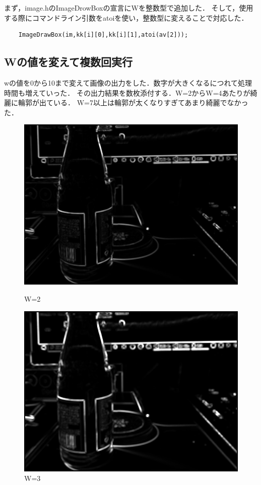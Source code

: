 \documentclass[11pt]{jarticle}
\begin{document}
まず，image.hのImageDrowBoxの宣言にWを整数型で追加した．
そして，使用する際にコマンドライン引数をatoiを使い，整数型に変えることで対応した．
\begin{verbatim}
    ImageDrawBox(im,kk[i][0],kk[i][1],atoi(av[2]));
\end{verbatim}

\subsection{Wの値を変えて複数回実行}
wの値を0から10まで変えて画像の出力をした．数字が大きくなるにつれて処理時間も増えていった．
その出力結果を数枚添付する．W=2からW=4あたりが綺麗に輪郭が出ている．
W=7以上は輪郭が太くなりすぎてあまり綺麗でなかった．
\begin{figure}[h]
    \begin{minipage}{0.5\hsize}
        \centering
        \includegraphics[scale=.3]{w2.jpg}
        \caption{W=2}
    \end{minipage}
    \begin{minipage}{0.5\hsize}
        \centering
        \includegraphics[scale=.3]{w3.jpg}
        \caption{W=3}
    \end{minipage}
\end{figure}
\end{document}
